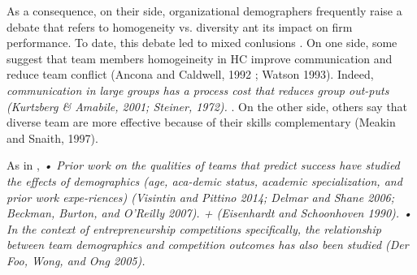 \begin{itemize}
\begin{itemize}
As a consequence, on their side, organizational demographers frequently raise a debate that refers to homogeneity vs. diversity ant its impact on firm performance. To date, this debate led to mixed conlusions \citet{beckman2007early}. On one side, some suggest that team members homogeineity in HC improve communication and reduce team conflict (Ancona and Caldwell, 1992 ; Watson 1993). Indeed, \textit{communication in large groups has a process cost that reduces group out-puts (Kurtzberg & Amabile, 2001; Steiner, 1972).} \citet{taylor2006superman}. On the other side, others say that diverse team are more effective because of their skills complementary (Meakin and Snaith, 1997).

As in \citet{ghassemiautomated}, \textit{•	Prior work on the qualities of teams that predict success have studied the effects of demographics (age, aca-demic status, academic specialization, and prior work expe-riences) (Visintin and Pittino 2014; Delmar and Shane 2006; Beckman, Burton, and O’Reilly 2007). + (Eisenhardt and Schoonhoven 1990). •	In the context of entrepreneurship competitions specifically, the relationship between team demographics and competition outcomes has also been studied (Der Foo, Wong, and Ong 2005).}


\end{itemize}
\end{itemize}
